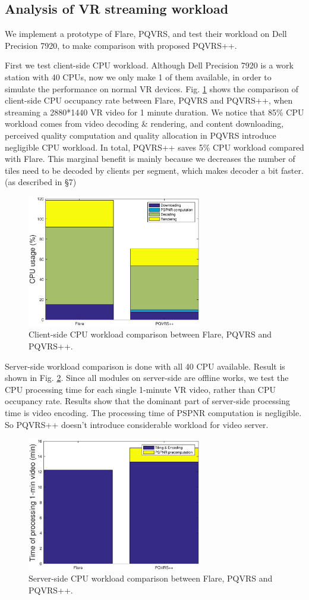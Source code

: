 \subsection{Analysis of VR streaming workload}

We implement a prototype of Flare, PQVRS, and test their workload on Dell Precision 7920, to make comparison with proposed PQVRS++.

First we test client-side CPU workload. Although Dell Precision 7920 is a work station with 40 CPUs, now we only make 1 of them available, in order to simulate the performance on normal VR devices. Fig. \ref{CPUclient} shows the comparison of client-side CPU occupancy rate between Flare, PQVRS and PQVRS++, when streaming a 2880*1440 VR video for 1 minute duration. We notice that 85\% CPU workload comes from video decoding \& rendering, and content downloading, perceived quality computation and quality allocation in PQVRS introduce negligible CPU workload. In total, PQVRS++ saves 5\% CPU workload compared with Flare. This marginal benefit is mainly because we decreases the number of tiles need to be decoded by clients per segment, which makes decoder a bit faster. (as described in \S 7)

    \begin{figure}
  \centering
  \includegraphics[width=3in]{images/CPUworkload.eps}
  \caption{Client-side CPU workload comparison between Flare, PQVRS and PQVRS++.}
  \label{CPUclient}
  \end{figure}
  
Server-side workload comparison is done with all 40 CPU available. Result is shown in Fig. \ref{CPUserver}. Since all modules on server-side are offline works, we test the CPU processing time for each single 1-minute VR video, rather than CPU occupancy rate. Results show that the dominant part of server-side processing time is video encoding. The processing time of PSPNR computation is negligible. So PQVRS++ doesn't introduce considerable workload for video server.

    \begin{figure}
  \centering
  \includegraphics[width=3in]{images/Processtime.eps}
  \caption{Server-side CPU workload comparison between Flare, PQVRS and PQVRS++.}
  \label{CPUserver}
  \end{figure}